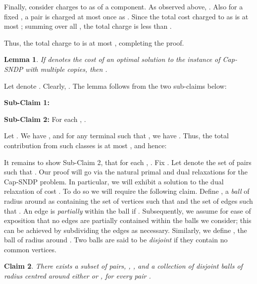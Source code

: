 \documentclass[11pt]{article}
\newtheorem{lemma}{Lemma}[section]
\newtheorem{claim}[lemma]{Claim}
\renewenvironment{proof}{\vspace{-0.1in}\noindent{\bf Proof:}}{\hspace*{\fill}\par}
\newenvironment{proofof}[1]{\smallskip\noindent{\bf Proof of #1:}}{\hspace*{\fill}\par}
\begin{document}
\begin{proof}
  Finally, consider charges to  as  of a
  component. As observed above, .  Also for a fixed
  , a pair is charged at most once as . Since the total
  cost charged to  as  is at most ;
  summing over all , the total charge is less than
  .

  Thus, the total charge to  is at most , completing the proof.
  \end{proof}

\begin{lemma}\label{lem:lowerBound}
  If  denotes the cost of an optimal solution to the instance of
  Cap-SNDP with multiple copies, then .
\end{lemma}
\begin{proof}
  Let  denote . Clearly,
  . 
  The lemma follows from the two sub-claims below:

  \noindent \textbf{Sub-Claim 1: }
  

  \noindent \textbf{Sub-Claim 2: }
  For each , .

  \begin{proofof}{Sub-Claim 1}
    Let . We have , and for
    any terminal  such that ,
    we have . Thus, the total
    contribution from such classes is at most , and hence:
    \vspace{-5mm}
    
  \end{proofof}


  \bigskip {}

  It remains to show Sub-Claim 2, that for each , .  Fix .  Let  denote the set of pairs  such
  that .  Our proof will go via the natural primal and
  dual relaxations for the Cap-SNDP problem. In particular, we will
  exhibit a solution to the dual relaxation of cost . To do so
  we will require the following claim.  Define , a {\em
    ball} of radius  around  as containing the set of vertices
   such that  and the set of edges  such
  that . An edge  is
  \emph{partially} within the ball if . Subsequently, we assume for ease of
  exposition that no edges are partially contained within the balls we
  consider; this can be achieved by subdividing the edges as
  necessary. Similarly, we define , the ball of radius
   around . Two balls are said to be \emph{disjoint} if they
  contain no common vertices.
  
  \begin{claim}\label{claim:balls}
    There exists a subset of pairs, , , and a collection of  disjoint balls of radius
     centred around either  or , for every pair
    .
  \end{claim}
  

\end{proof}
\end{document}
